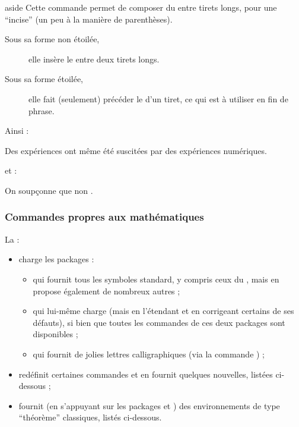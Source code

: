 \begin{docCommand}{aside}{}
  Cette commande permet de composer du  entre tirets longs, pour une
  \enquote{incise} (un peu à la manière de parenthèses).
  \begin{description}
  \item[Sous sa forme non étoilée,] elle insère le  entre deux
    tirets longs.
  \item[Sous sa forme étoilée,] elle fait (seulement) précéder le 
    d'un tiret, ce qui est à utiliser en fin de phrase.
  \end{description}
  Ainsi :
\begin{bodycode}
Des expériences  ont même été suscitées
par des expériences numériques.
\end{bodycode}
  et :
\begin{bodycode}
On soupçonne que non .
\end{bodycode}
\end{docCommand}


\subsubsection{Commandes propres aux mathématiques}
\label{sec-comm-propr-aux}

La \gztauthorcl{} :
\begin{itemize}
\item charge les packages :
  \begin{itemize}
  \item {} qui fournit tous les symboles standard, y compris
    ceux du , mais en propose également de nombreux autres ;
  \item {} qui lui-même charge  (mais en
    l'étendant et en corrigeant certains de ses défauts), si bien que toutes les
    commandes de ces deux packages sont disponibles ;
  \item {} qui fournit de jolies lettres calligraphiques (via
    la commande ) ;
  \end{itemize}
\item redéfinit certaines commandes et en fournit quelques nouvelles, listées
  ci-dessous ;
\item fournit (en s'appuyant sur les packages  et
  ) des environnements de type \enquote{théorème} classiques,
  listés ci-dessous.
\end{itemize}

